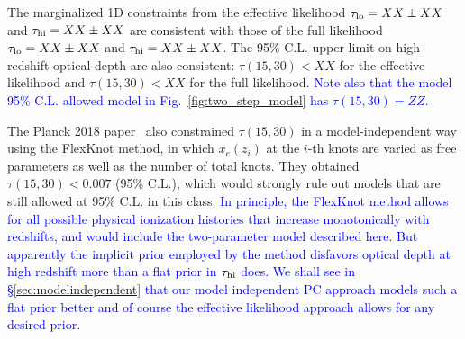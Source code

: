 \documentclass[prd,twocolumn,amsmath,amssymb,floatfix,superscriptaddress,nofootinbib]{revtex4-1}
\newcommand{\tauhi}{\tau_{\rm hi}}
\newcommand{\taulo}{\tau_{\rm lo}}
\newcommand{\wh}[1]{\textcolor{blue}{#1}}
\begin{document}
The marginalized 1D constraints from the effective likelihood $\taulo = XX \pm XX$ and $\tauhi = XX \pm XX$ are consistent with those of the full likelihood $\taulo = XX \pm XX$ and $\tauhi = XX \pm XX$. 
The 95\% C.L. upper limit on high-redshift optical depth are also consistent: $\tau(15, 30) < XX$ for the effective likelihood and $\tau(15, 30) < XX$ for the full likelihood.
\wh{Note also that the model 95\% C.L. allowed model in 
Fig.~\ref{fig:two_step_model} has
$\tau(15,30)= ZZ$.}


The Planck 2018 paper~\cite{Aghanim:2018eyx} also constrained $\tau(15, 30)$ in a model-independent way using the FlexKnot method, in which $x_e(z_i)$ at the $i$-th knots are varied as free parameters as well as the number of total knots. They obtained $\tau(15, 30) < 0.007$ (95\% C.L.), which would strongly rule out models that are still allowed at 95\% C.L. in this class. 
\wh{
 In principle, the FlexKnot method allows for all possible physical ionization histories that increase monotonically with redshifts, and would include the two-parameter model described here. But apparently the implicit prior employed by the method disfavors optical depth at high redshift more than a flat prior in 
$\tau_{\rm hi}$ does.  We shall see in \S \ref{sec:modelindependent} that our model independent PC approach models such a flat prior better and of course the effective likelihood approach allows for any desired prior.}




%
\end{document}

